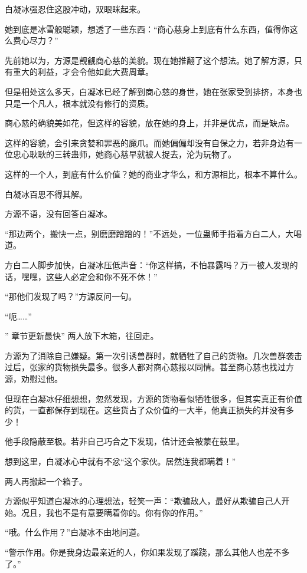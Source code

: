 
\begin{this_body}

白凝冰强忍住这股冲动，双眼眯起来。

她到底是冰雪般聪颖，想透了一些东西：“商心慈身上到底有什么东西，值得你这么费心尽力？”

先前她以为，方源是觊觎商心慈的美貌。现在她推翻了这个想法。她了解方源，只有重大的利益，才会令他如此大费周章。

但是相处这么多天，白凝冰已经了解到商心慈的身世，她在张家受到排挤，本身也只是一个凡人，根本就没有修行的资质。

商心慈的确貌美如花，但这样的容貌，放在她的身上，并非是优点，而是缺点。

这样的容貌，会引来贪婪和罪恶的魔爪。而她偏偏却没有自保之力，若非身边有一位忠心耿耿的三转蛊师，她商心慈早就被人捉去，沦为玩物了。

这样的一个人，到底有什么价值？她的商业才华么，和方源相比，根本不算什么。

白凝冰百思不得其解。

方源不语，没有回答白凝冰。

“那边两个，搬快一点，别磨磨蹭蹭的！”不远处，一位蛊师手指着方白二人，大喝道。

方白二人脚步加快，白凝冰压低声音：“你这样搞，不怕暴露吗？万一被人发现的话，嘿嘿，这些人必定会和你不死不休！”

“那他们发现了吗？”方源反问一句。

“呃……”

” 章节更新最快” 两人放下木箱，往回走。

方源为了消除自己嫌疑。第一次引诱兽群时，就牺牲了自己的货物。几次兽群袭击过后，张家的货物损失最多。很多人都对商心慈报以同情。甚至商心慈也找过方源，劝慰过他。

但现在白凝冰仔细想想，忽然发现，方源的货物看似牺牲很多，但其实真正有价值的货，一直都保存到现在。这些货占了众价值的一大半，他真正损失的并没有多少！

他手段隐蔽至极。若非自己巧合之下发现，估计还会被蒙在鼓里。

想到这里，白凝冰心中就有不忿“这个家伙。居然连我都瞒着！”

两人再搬起一个箱子。

方源似乎知道白凝冰的心理想法，轻笑一声：“欺骗敌人，最好从欺骗自己人开始。况且，我也不是有意要瞒着你的。你有你的作用。”

“哦。什么作用？”白凝冰不由地问道。

“警示作用。你是我身边最亲近的人，你如果发现了蹊跷，那么其他人也差不多了。”


\end{this_body}
